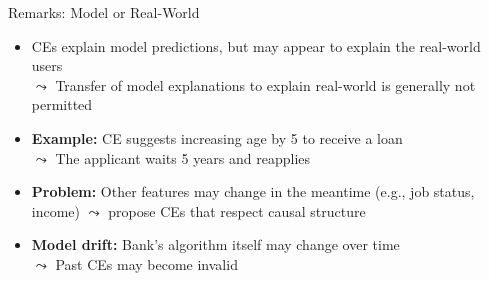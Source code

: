 \documentclass[11pt,compress,t,notes=noshow, aspectratio=169, xcolor=table, usenames,dvipsnames]{beamer}
\begin{document}
\begin{frame}{Remarks: Model or Real-World}

	\begin{itemize}
	\item CEs explain model predictions, but may appear to explain the real-world users\\
$\leadsto$ Transfer of model explanations to explain real-world is generally not permitted
  \item \textbf{Example:} CE suggests increasing age by 5 to receive a loan\\
  $\leadsto$ The applicant waits 5 years and reapplies
  \pause
  \item \textbf{Problem:} Other features may change in the meantime (e.g., job status, income)  
  $\leadsto$  propose CEs that respect causal structure
  \item \textbf{Model drift:} Bank's algorithm itself may change over time\\
  $\leadsto$ Past CEs may become invalid
	\end{itemize}
\end{frame}



\endlecture
\end{document}

